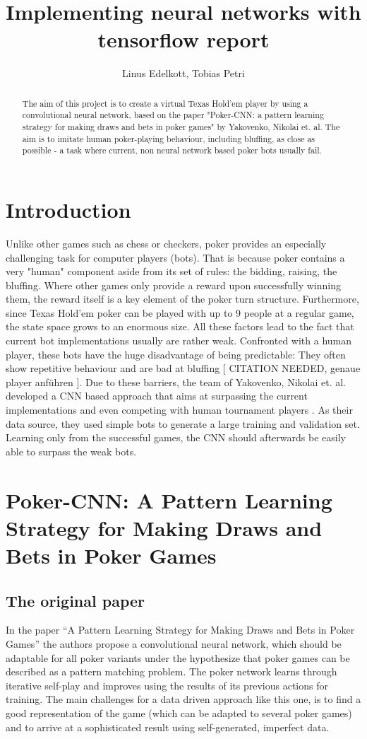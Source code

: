 \documentclass[]{report}
\title{Implementing neural networks with tensorflow report}
\author{Linus Edelkott, Tobias Petri}
\begin{document}
\maketitle

\begin{abstract}
The aim of this project is to create a virtual Texas Hold'em player by using a convolutional neural network, based on the paper "Poker-CNN: a pattern learning strategy for making draws and bets in poker games" \cite{1} by Yakovenko, Nikolai et. al.
The aim is to imitate human poker-playing behaviour, including bluffing, as close as possible - a task where current, non neural network based poker bots usually fail.
\end{abstract}


\section{Introduction}
Unlike other games such as chess or checkers, poker provides an especially challenging task for computer players (bots). That is because poker contains a very "human" component aside from its set of rules: the bidding, raising, the bluffing. Where other games only provide a reward upon successfully winning them, the reward itself is a key element of the poker turn structure. Furthermore, since Texas Hold'em poker can be played with up to 9 people at a regular game, the state space grows to an enormous size. All these factors lead to the fact that current bot implementations usually are rather weak. Confronted with a human player, these bots have the huge disadvantage of being predictable: They often show repetitive behaviour and are bad at bluffing [ CITATION NEEDED, genaue player anführen ]. Due to these barriers, the team of Yakovenko, Nikolai et. al. developed a CNN based approach that aims at surpassing the current implementations and even competing with human tournament players \cite{1}. As their data source, they used simple bots to generate a large training and validation set. Learning only from the successful games, the CNN should afterwards be easily able to surpass the weak bots.    

\section{Poker-CNN: A Pattern Learning Strategy for Making Draws and Bets in Poker Games}
\subsection{The original paper}
In the paper ``A Pattern Learning Strategy for Making Draws and Bets
in Poker Games''\cite{1} the authors propose a convolutional
neural network, which should be adaptable for all poker variants under
the hypothesize that poker games can be described as a pattern matching
problem. The poker network learns through iterative self-play and
improves using the results of its previous actions for training. The
main challenges for a data driven approach like this one, is to find
a good representation of the game (which can be adapted to several
poker games) and to arrive at a sophisticated result using self-generated,
imperfect data.
\end{document}
